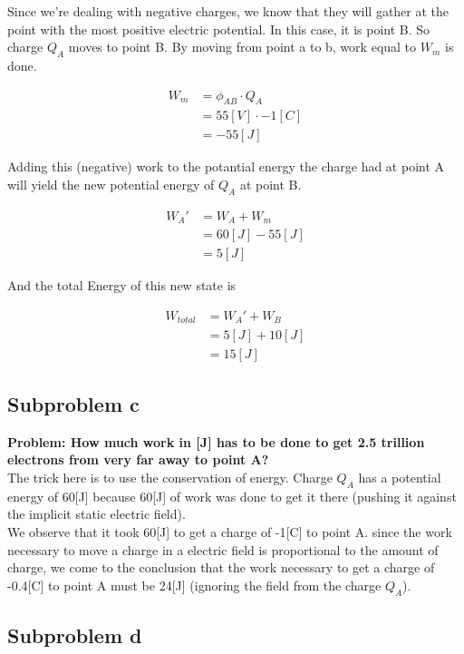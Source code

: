 \documentclass[paper=a4, fontsize=11pt]{scrartcl} %
\numberwithin{equation}{section} %
\numberwithin{figure}{section} %
\numberwithin{table}{section} %
\begin{document}
Since we're dealing with negative charges, we know that they will gather at the point with the most
positive electric potential. In this case, it is point B. So charge $Q_A$ moves to point B.
By moving from point a to b, work equal to $W_m$ is done.

\begin{align} \label{eq:8}
W_m &= \phi_{AB} \cdot Q_A \\
       &=  55[V] \cdot -1[C] \\
       &=  -55[J]
\end{align}

Adding this (negative) work to the potantial energy the charge had at point A will yield the new potential
energy of $Q_A$ at point B.

\begin{align} \label{eq:8}
W_A' &= W_A + W_m \\
       &=  60[J] -55[J] \\
       &=  5[J]
\end{align}

And the total Energy of this new state is

\begin{align} \label{eq:8}
W_{total} &= W_A' + W_B \\
       &=  5[J] + 10[J] \\
       &=  15[J]
\end{align}

\subsection{Subproblem c}

\textbf{Problem: How much work in [J] has to be done to get 2.5 trillion electrons from very far away to point A?}
\\

The trick here is to use the conservation of energy. Charge $Q_A$ has a potential
energy of 60[J] because 60[J] of work was done to get it there (pushing it against the implicit static electric field).
\\

We observe that it took 60[J] to get a charge of -1[C] to point A. since the work necessary to move a
charge in a electric field is proportional to the amount of charge, we come to the conclusion
that the work necessary to get a charge of -0.4[C] to point A must be 24[J] (ignoring the field from the charge $Q_A$).

\subsection{Subproblem d}
\end{document}
